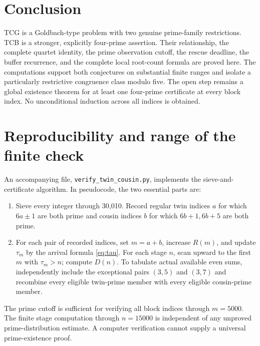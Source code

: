 \documentclass[11pt,a4paper]{article}
\numberwithin{equation}{section}
\theoremstyle{definition}
\begin{document}
\section{Conclusion}
TCG is a Goldbach-type problem with two genuine prime-family restrictions. TCB is a stronger, explicitly four-prime assertion. Their relationship, the complete quartet identity, the prime observation cutoff, the rescue deadline, the buffer recurrence, and the complete local root-count formula are proved here. The computations support both conjectures on substantial finite ranges and isolate a particularly restrictive congruence class modulo five. The open step remains a global existence theorem for at least one four-prime certificate at every block index. No unconditional induction across all indices is obtained.

\appendix
\section{Reproducibility and range of the finite check}
An accompanying file, \texttt{verify\_twin\_cousin.py}, implements the sieve-and-certificate algorithm. In pseudocode, the two essential parts are:
\begin{enumerate}[leftmargin=20pt]
\item Sieve every integer through 30,010. Record regular twin indices \(a\) for which \(6a\pm1\) are both prime and cousin indices \(b\) for which \(6b+1,6b+5\) are both prime.
\item For each pair of recorded indices, set \(m=a+b\), increase \(R(m)\), and update \(\tau_m\) by the arrival formula \eqref{eq:tau}. For each stage \(n\), scan upward to the first \(m\) with \(\tau_m>n\); compute \(D(n)\). To tabulate actual available even sums, independently include the exceptional pairs \((3,5)\) and \((3,7)\) and recombine every eligible twin-prime member with every eligible cousin-prime member.
\end{enumerate}
The prime cutoff is sufficient for verifying all block indices through \(m=5000\). The finite stage computation through \(n=15000\) is independent of any unproved prime-distribution estimate. A computer verification cannot supply a universal prime-existence proof.



\end{document}
